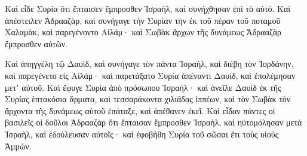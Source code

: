 {\par }{\PP {}Καὶ εἶδε Συρία ὅτι ἔπταισεν ἔμπροσθεν Ἰσραὴλ, καὶ συνήχθησαν ἐπὶ τὸ αὐτό.
Καὶ ἀπέστειλεν Ἀδρααζὰρ, καὶ συνήγαγε τὴν Συρίαν τὴν ἐκ τοῦ πέραν τοῦ ποταμοῦ Χαλαμὰκ, καὶ παρεγένοντο Αἱλάμ· καὶ Σωβὰκ ἄρχων τῆς δυνάμεως Ἀδρααζὰρ ἔμπροσθεν αὐτῶν.
\par }{\PP {}Καὶ ἀπηγγέλη τῷ Δαυὶδ, καὶ συνήγαγε τὸν πάντα Ἰσραὴλ, καὶ διέβη τὸν Ἰορδάνην, καὶ παρεγένετο εἰς Αἰλάμ· καὶ παρετάξατο Συρία ἀπέναντι Δαυὶδ, καὶ ἐπολέμησαν μετʼ αὐτοῦ.
Καὶ ἔφυγε Συρία ἀπὸ πρόσωπου Ἰσραήλ· καὶ ἀνεῖλε Δαυὶδ ἐκ τῆς Συρίας ἑπτακόσια ἅρματα, καὶ τεσσαράκοντα χιλιάδας ἱππέων, καὶ τὸν Σωβὰκ τὸν ἄρχοντα τῆς δυνάμεως αὐτοῦ ἐπάταξε, καὶ ἀπέθανεν ἐκεῖ.
Καὶ εἶδαν πάντες οἱ βασιλεῖς οἱ δοῦλοι Ἀδρααζὰρ ὅτι ἔπταισαν ἔμπροσθεν Ἰσραὴλ, καὶ ηὐτομόλησαν μετὰ Ἰσραὴλ, καὶ ἐδούλευσαν αὐτοῖς· καὶ ἐφοβήθη Συρία τοῦ σῶσαι ἔτι τοὺς υἱοὺς Ἀμμών.

}
